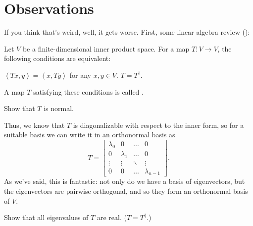 \section{Observations}
If you think that's weird, well, it gets worse.
First, some linear algebra review ():
\begin{definition}
	Let $V$ be a finite-dimensional inner product space.
	For a map $T \colon V \to V$, the following conditions are equivalent:
	\begin{itemize}
		\ii $\left< Tx, y\right> = \left< x, Ty \right>$
		for any $x,y \in V$.
		\ii $T = T^\dagger$.
	\end{itemize}
	A map $T$ satisfying these conditions is called .
\end{definition}
\begin{ques}
	Show that $T$ is normal.
\end{ques}
Thus, we know that $T$ is diagonalizable
with respect to the inner form, so for a suitable basis we
can write it in an orthonormal basis as
\[
	T = \begin{bmatrix}
		\lambda_0 & 0 & \dots & 0 \\
		0 & \lambda_1 & \dots & 0 \\
		\vdots & \vdots & \ddots & \vdots \\
		0 & 0 & \dots & \lambda_{n-1}
	\end{bmatrix}.
\]
As we've said, this is fantastic:
not only do we have a basis of eigenvectors,
but the eigenvectors are pairwise orthogonal,
and so they form an orthonormal basis of $V$.
\begin{ques}
	Show that all eigenvalues of $T$ are real.
	($T = T^\dagger$.)
\end{ques}

